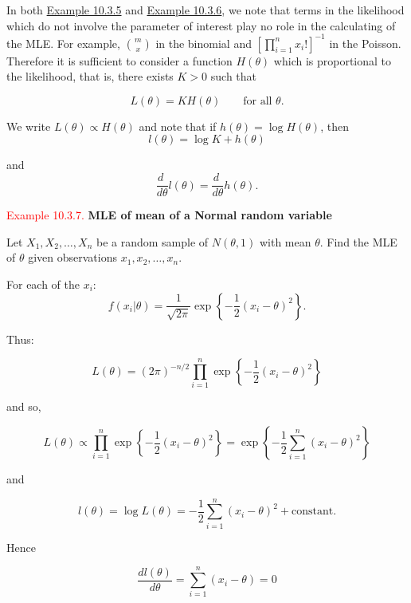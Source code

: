 \documentclass[
]{book}
\begin{document}
\hfill\break

In both \protect\hyperlink{MLE:exer:bin_mle}{Example 10.3.5} and \protect\hyperlink{MLE:ex:pois_mle}{Example 10.3.6}, we note that terms in the likelihood which do not involve the parameter of interest play no role in the calculating of the MLE. For example, \(\binom{m}{x}\) in the binomial and \(\left[\prod\limits_{i=1}^n x_i!\right]^{-1}\) in the Poisson. Therefore it is sufficient to consider a function \(H(\theta)\) which is proportional to the likelihood, that is, there exists \(K >0\) such that

\[ L(\theta) = K H(\theta) \qquad \mbox{for all } \theta. \]

We write \(L(\theta) \propto H(\theta)\) and note that if \(h(\theta) = \log H (\theta)\), then\\

\[ l(\theta) = \log K + h (\theta)\]

and\\

\[ \frac{d \;}{d \theta} l (\theta) = \frac{d \;}{d \theta} h (\theta).\]

\leavevmode{}%
\textcolor{red}{Example 10.3.7.}
{\textbf{MLE of mean of a Normal random variable}}

Let \(X_1,X_2, \ldots, X_n\) be a random sample of \(N(\theta,1)\) with mean \(\theta\). Find the MLE of \(\theta\) given observations \(x_1, x_2, \ldots, x_n\).

\hfill\break

For each of the \(x_i\):\\

\[ f(x_i|\theta) = \frac{1}{\sqrt{2\pi}} \exp \left\{ -\frac{1}{2} \left(x_i-\theta\right)^2 \right\}.\]

Thus:

\[ L(\theta) = \left( 2 \pi\right)^{-n/2} \prod \limits_{i=1}^n \exp \left\{ -\frac{1}{2} \left(x_i-\theta\right)^2 \right\} \]

and so,

\[ L(\theta) \propto \prod \limits_{i=1}^n \exp \left\{ -\frac{1}{2} \left(x_i-\theta\right)^2 \right\} = \exp \left\{ -\frac{1}{2} \sum_{i=1}^n (x_i-\theta)^2\right\} \]

and

\[ l(\theta) = \log L(\theta) = -\frac{1}{2} \sum _{i=1}^n \left(x_i-\theta\right)^2 +
\text{constant}.\]

Hence

\[ \frac{dl(\theta)}{d\theta} = \sum _{i=1}^n (x_i-\theta) = 0\]
\end{document}

